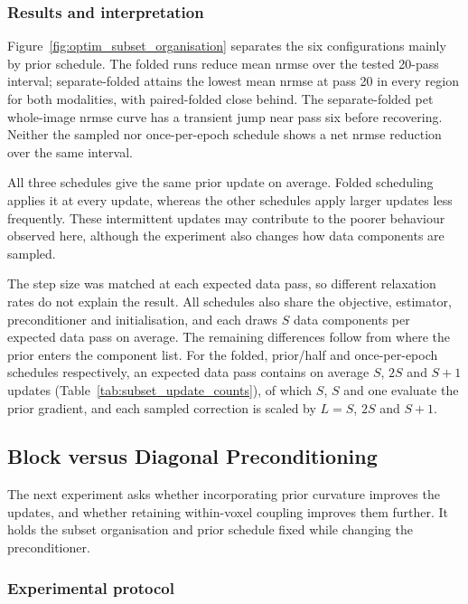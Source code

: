 \subsubsection{Results and interpretation}

Figure~\ref{fig:optim_subset_organisation} separates the six configurations mainly by prior schedule. The folded runs reduce mean \gls{nrmse} over the tested 20-pass interval; separate-folded attains the lowest mean \gls{nrmse} at pass 20 in every region for both modalities, with paired-folded close behind. The separate-folded \gls{pet} whole-image \gls{nrmse} curve has a transient jump near pass six before recovering. Neither the sampled nor once-per-epoch schedule shows a net \gls{nrmse} reduction over the same interval.

All three schedules give the same prior update on average. Folded scheduling applies it at every update, whereas the other schedules apply larger updates less frequently. These intermittent  updates may contribute to the poorer behaviour observed here, although the experiment also changes how data components are sampled.

The step size was matched at each expected data pass, so different relaxation rates do not explain the result. All schedules also share the objective, estimator, preconditioner and initialisation, and each draws $S$ data components per expected data pass on average. The remaining differences follow from where the prior enters the component list. For the folded, prior/half and once-per-epoch schedules respectively, an expected data pass contains on average $S$, $2S$ and $S+1$ updates (Table~\ref{tab:subset_update_counts}), of which $S$, $S$ and one evaluate the prior gradient, and each sampled correction is scaled by $L=S$, $2S$ and $S+1$.

\subsection{Block versus Diagonal Preconditioning}
\label{subsec:optimisation_block_vs_diag}

The next experiment asks whether incorporating prior curvature improves the updates, and whether retaining within-voxel coupling improves them further. It holds the subset organisation and prior schedule fixed while changing the preconditioner.

\subsubsection{Experimental protocol}
\label{subsec:preconditioner_experiment_methods}

